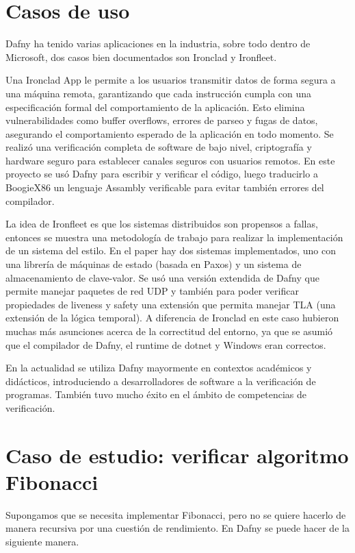 \documentclass[runningheads]{llncs}
\begin{document}
\section{Casos de uso}

Dafny ha tenido varias aplicaciones en la industria, sobre todo dentro de Microsoft, dos casos bien documentados son Ironclad y Ironfleet.

Una Ironclad\cite{hawblitzel2014ironclad} App le permite a los usuarios transmitir datos de forma segura a una máquina remota, garantizando que cada instrucción cumpla con una especificación 
formal del comportamiento de la aplicación. Esto elimina vulnerabilidades como buffer overflows, errores de parseo y fugas de datos, asegurando el comportamiento esperado de la aplicación en todo momento.
Se realizó una verificación completa de software de bajo nivel, criptografía y hardware seguro para establecer canales seguros con usuarios remotos.
En este proyecto se usó Dafny para escribir y verificar el código, luego traducirlo a BoogieX86 un lenguaje Assambly verificable para evitar también errores del compilador.

La idea de Ironfleet\cite{hawblitzel2015ironfleet} es que los sistemas distribuidos son propensos a fallas, entonces se muestra una metodología de trabajo para realizar la implementación de un 
sistema del estilo. En el paper hay dos sistemas implementados, uno con una librería de máquinas de estado (basada en Paxos) y un sistema de almacenamiento de clave-valor.
Se usó una versión extendida de Dafny que permite manejar paquetes de red UDP y también para poder verificar propiedades de liveness y safety una extensión que permita manejar TLA 
(una extensión de la lógica temporal).
A diferencia de Ironclad en este caso hubieron muchas más asunciones acerca de la correctitud del entorno, ya que se asumió que el compilador de Dafny, el runtime de dotnet y Windows eran correctos.

En la actualidad se utiliza Dafny mayormente en contextos académicos y didácticos, introduciendo a desarrolladores de software a la verificación de programas.
También tuvo mucho éxito en el ámbito de competencias de verificación.


\section{Caso de estudio: verificar algoritmo Fibonacci}
Supongamos que se necesita implementar Fibonacci, pero no se quiere hacerlo de manera recursiva por una cuestión de rendimiento. En Dafny se puede hacer de la siguiente manera.
\end{document}

